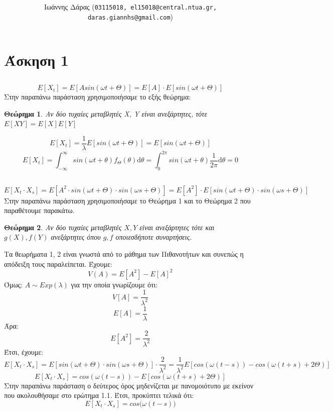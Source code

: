 \documentclass[a4paper,oneside, 11pt]{article}
\title{\textbf{}}
\author{ Ιωάννης Δάρας (\texttt{03115018, el15018@central.ntua.gr, daras.giannhs@gmail.com}) \\
}
\date{}
\newtheorem{theorem}{Θεώρημα}
\begin{document}
\maketitle
\noindent\makebox[\linewidth]{\rule{\paperwidth}{0.4pt}}



\section*{Άσκηση 1}
\subsection{}
$$
E[X_t] = E[Asin(\omega t + \Theta)] = E[A] \cdot E[sin(\omega t + \Theta)]
$$
Στην παραπάνω παράσταση χρησιμοποιήσαμε το εξής θεώρημα:
\begin{theorem}
	Αν δύο τυχαίες μεταβλητές X, Y είναι ανεξάρτητες, τότε $E[XY] = E[X] E[Y]$
\end{theorem}
$$
E[X_t] = \frac{1}{\lambda}E[sin(\omega t + \Theta)] = E[sin(\omega t + \Theta)]
$$
$$
E[X_t] = \int_{-\infty}^{\infty} sin(\omega t + \theta) f_{\Theta}(\theta) \textrm{d}\theta = \int_{0}^{2\pi} sin(\omega t + \theta) \frac{1}{2\pi}\textrm{d}\theta = 0$$
\subsection{}
$$
E[X_t \cdot X_s] = E[A^2 \cdot sin(\omega t + \Theta) \cdot sin(\omega s + \Theta)] 
= E[A^2] \cdot E[sin(\omega t + \Theta) \cdot sin(\omega s + \Theta)]$$
Στην παραπάνω παράσταση χρησιμοποιήσαμε το Θεώρημα 1 και το Θεώρημα 2 που παραθέτουμε παρακάτω.
\begin{theorem}
	Αν δύο τυχαίες μεταβλητές $X, Y$ είναι ανεξάρτητες τότε και $g(X), f(Y)$ ανεξάρτητες όπου $g, f$ οποιεσδήποτε συναρτήσεις.
\end{theorem}

Τα θεωρήματα 1, 2 είναι γνωστά από το μάθημα των Πιθανοτήτων και συνεπώς η απόδειξη τους παραλείπεται.
Έχουμε:
$$
V(A) = E[A^2] - E[A]^2
$$
Όμως: $A \sim Exp(\lambda)$ για την οποία γνωρίζουμε ότι: $$V[A]=\frac{1}{\lambda^2}$$
$$
E[A] = \frac{1}{\lambda}
$$
Άρα:
$$
E[A^2] = \frac{2}{\lambda^2}
$$
Έτσι, έχουμε:
$$
E[X_t\cdot X_s] = E[sin(\omega t + \Theta) \cdot sin(\omega s + \Theta)] \cdot \frac{2}{\lambda^2} = \frac{1}{\lambda^2} E[cos(\omega (t-s)) - cos(\omega (t+s) + 2\Theta)]
$$
$$
E[X_t\cdot X_s] = cos(\omega (t-s)) - E[cos(\omega (t+s) + 2\Theta)]
$$
Στην παραπάνω παράσταση ο δεύτερος όρος μηδενίζεται με πανομοιότυπο με εκείνον που ακολουθήσαμε στο ερώτημα 1.1. Έτσι, προκύπτει τελικά ότι:
$$
E[X_t \cdot X_s] = cos\big( \omega (t-s)\big)
$$
\end{document}
